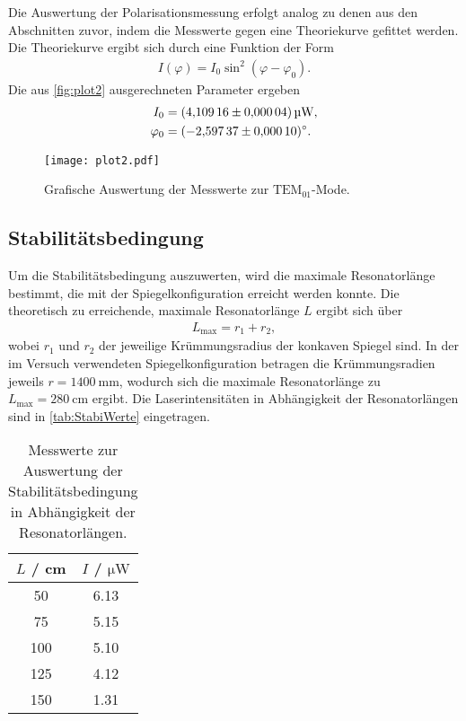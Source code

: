 Die Auswertung der Polarisationsmessung erfolgt analog zu denen aus den Abschnitten zuvor, indem die Messwerte gegen eine Theoriekurve gefittet werden.
Die Theoriekurve ergibt sich durch eine Funktion der Form
\begin{align}
  I(\varphi) = I_0 \sin^2(\varphi-\varphi_0).
\end{align}
Die aus \autoref{fig:plot2} ausgerechneten Parameter ergeben
\begin{align*}
  I_0 &= \SI{4.10916 \pm 0.00004}{\micro\watt}, \\
  \varphi_0 &= \SI{-2.59737 \pm 0.00010}{\degree}.
\end{align*}

\begin{figure}[H]
  \centering
  \texttt{[image: plot2.pdf]}
  \caption{Grafische Auswertung der Messwerte zur $\text{TEM}_{01}$-Mode.}
  \label{fig:plot2}
\end{figure}


\subsection{Stabilitätsbedingung}
\label{subsec:Stabilitätsbedingung}
Um die Stabilitätsbedingung auszuwerten, wird die maximale Resonatorlänge bestimmt, die mit der Spiegelkonfiguration erreicht werden konnte. Die theoretisch zu erreichende, maximale
Resonatorlänge $L$ ergibt sich über 
\begin{align*}
  L_{\text{max}}=r_1+r_2,
\end{align*}
wobei $r_1$ und $r_2$ der jeweilige Krümmungsradius der konkaven Spiegel sind. In der im Versuch verwendeten Spiegelkonfiguration betragen die Krümmungsradien jeweils $r=\SI{1400}{\milli\meter}$,
wodurch sich die maximale Resonatorlänge zu $L_\text{max} = \SI{280}{\centi\meter}$ ergibt.
Die Laserintensitäten in Abhängigkeit der Resonatorlängen sind in \autoref{tab:StabiWerte} eingetragen.


\begin{table}[H]
  \centering
  \caption{Messwerte zur Auswertung der Stabilitätsbedingung in Abhängigkeit der Resonatorlängen.}
  \label{tab:StabiWerte}
  \begin{tabular}{c c}
      \toprule
      $L$ / cm & $I$ / $\si{\micro\watt}$\\
      \midrule
      50 & 6.13 \\
      75 & 5.15 \\
      100 & 5.10 \\
      125 & 4.12 \\
      150 & 1.31 \\
      \bottomrule
  \end{tabular}
\end{table}

